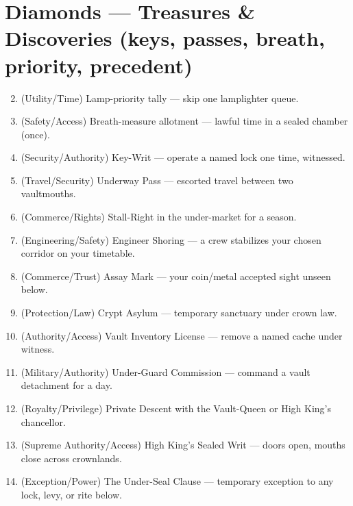 \section*{Diamonds --- Treasures \& Discoveries (keys, passes, breath, priority, precedent)}
\label{sec:aeler-rewards}
\begin{enumerate}
\setcounter{enumi}{1}
\item {} (Utility/Time) Lamp-priority tally --- skip one lamplighter queue.
\item {} (Safety/Access) Breath-measure allotment --- lawful time in a sealed chamber (once).
\item {} (Security/Authority) Key-Writ --- operate a named lock one time, witnessed.
\item {} (Travel/Security) Underway Pass --- escorted travel between two vaultmouths.
\item {} (Commerce/Rights) Stall-Right in the under-market for a season.
\item {} (Engineering/Safety) Engineer Shoring --- a crew stabilizes your chosen corridor on your timetable.
\item {} (Commerce/Trust) Assay Mark --- your coin/metal accepted sight unseen below.
\item {} (Protection/Law) Crypt Asylum --- temporary sanctuary under crown law.
\item {} (Authority/Access) Vault Inventory License --- remove a named cache under witness.
\item {} (Military/Authority) Under-Guard Commission --- command a vault detachment for a day.
\item {} (Royalty/Privilege) Private Descent with the Vault-Queen or High King's chancellor.
\item {} (Supreme Authority/Access) High King's Sealed Writ --- doors open, mouths close across crownlands.
\item {} (Exception/Power) The Under-Seal Clause --- temporary exception to any lock, levy, or rite below.
\end{enumerate}

